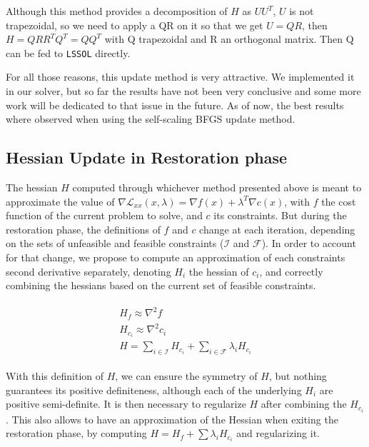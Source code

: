 Although this method provides a decomposition of $H$ as $U U^T$, $U$ is not trapezoidal, so we need to apply a QR on it so that we get $U=QR$, then $H=Q R R^T Q^T=Q Q^T$ with Q trapezoidal and R an orthogonal matrix.
Then Q can be fed to {\tt LSSOL} directly.

For all those reasons, this update method is very attractive.
We implemented it in our solver, but so far the results have not been very conclusive and some more work will be dedicated to that issue in the future.
As of now, the best results where observed when using the self-scaling BFGS update method.

\subsection{Hessian Update in Restoration phase}
\label{sub:hessian_update_in_restoration_phase}

The hessian $H$ computed through whichever method presented above is meant to approximate the value of $\nabla \mathcal{L}_{xx}(x,\lambda) = \nabla f(x) + \lambda^T \nabla c(x)$, with $f$ the cost function of the current problem to solve, and $c$ its constraints.
But during the restoration phase, the definitions of $f$ and $c$ change at each iteration, depending on the sets of unfeasible and feasible constraints ($\mathcal{I}$ and $\mathcal{F}$).
In order to account for that change, we propose to compute an approximation of each constraints second derivative separately, denoting $H_i$ the hessian of $c_i$, and correctly combining the hessians based on the current set of feasible constraints.

\begin{align}
  \begin{split}
    H_f \approx \nabla^2 f\\
    H_{c_i} \approx \nabla^2 c_i\\
    H = \sum_{i\in \mathcal{I}}H_{c_i} + \sum_{i\in \mathcal{F}}\lambda_i H_{c_i}
  \end{split}
\end{align}

With this definition of $H$, we can ensure the symmetry of $H$, but nothing guarantees its positive definiteness, although each of the underlying $H_i$ are positive semi-definite.
It is then necessary to regularize $H$ after combining the $H_{c_i}$.
This also allows to have an approximation of the Hessian when exiting the restoration phase, by computing $H = H_f + \sum \lambda_i H_{c_i}$ and regularizing it.


